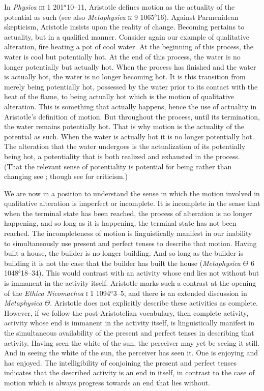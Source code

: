 In \emph{Physica} \textsc{iii} 1 201\( ^{a} \)10--11, Aristotle defines motion as the actuality of the potential as such (see also \emph{Metaphysica} \textsc{k} 9 1065\( ^{b} \)16). Against Parmenidean skepticism, Aristotle insists upon the reality of change. Becoming pertains to actuality, but in a qualified manner. Consider again our example of qualitative alteration, fire heating a pot of cool water. At the beginning of this process, the water is cool but potentially hot. At the end of this process, the water is no longer potentially but actually hot. When the process has finished and the water is actually hot, the water is no longer becoming hot. It is this transition from merely being potentially hot, possessed by the water prior to its contact with the heat of the flame, to being actually hot which is the motion of qualitative alteration. This is something that actually happens, hence the use of actuality in Aristotle's definition of motion. But throughout the process, until its termination, the water remains potentially hot. That is why motion is the actuality of the potential as such. When the water is actually hot it is no longer potentially hot. The alteration that the water undergoes is the actualization of its potentially being hot, a potentiality that is both realized and exhausted in the process. (That the relevant sense of potentiality is potential for being rather than changing see \citealt{Kosman:1969aa}; though see \citealt{Heinaman:1994aa} for criticism.)

We are now in a position to understand the sense in which the motion involved in qualitative alteration is imperfect or incomplete. It is incomplete in the sense that when the terminal state has been reached, the process of alteration is no longer happening, and so long as it is happening, the terminal state has not been reached. The incompleteness of motion is linguistically manifest in our inability to simultaneously use present and perfect tenses to describe that motion. Having built a house, the builder is no longer building. And so long as the builder is building it is not the case that the builder has built the house (\emph{Metaphysica} \( \Theta \) 6 1048\( ^{b} \)18--34). This would contrast with an activity whose end lies not without but is immanent in the activity itself. Aristotle marks such a contrast at the opening of the \emph{Ethica Nicomachea} \textsc{i} 1 1094\( ^{a} \)3--5, and there is an extended discussion in \emph{Metaphysica} \( \Theta \). Aristotle does not explicitly describe these activities as complete. However, if we follow the post-Aristotelian vocabulary, then complete activity, activity whose end is immanent in the activity itself, is linguistically manifest in the simultaneous availability of the present and perfect tenses in describing that activity. Having seen the white of the sun, the perceiver may yet be seeing it still. And in seeing the white of the sun, the perceiver has seen it. One is enjoying and has enjoyed. The intelligibility of conjoining the present and perfect tenses indicates that the described activity is an end in itself, in contrast to the case of motion which is always progress towards an end that lies without.

